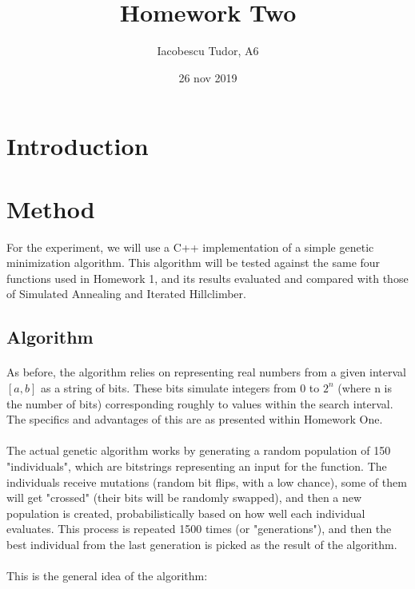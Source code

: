 \documentclass{article}
\title{Homework Two}
\date{26 nov 2019}
\author{Iacobescu Tudor, A6}
\begin{document}
	\maketitle
	
	\section{Introduction}

	\section{Method}
    For the experiment, we will use a C++ implementation of a simple genetic minimization algorithm. This algorithm will be tested against the same four functions used in Homework 1, and its results evaluated and compared with those of Simulated Annealing and Iterated Hillclimber.

    \subsection{Algorithm}
    \paragraph{}
    As before, the algorithm relies on representing real numbers from a given interval \([a, b]\) as a string of bits. These bits simulate integers from 0 to \(2^n\) (where n is the number of bits) corresponding roughly to values within the search interval. The specifics and advantages of this are as presented within Homework One.
    \paragraph{}
    The actual genetic algorithm works by generating a random population of 150 "individuals", which are bitstrings representing an input for the function. The individuals receive mutations (random bit flips, with a low chance), some of them will get "crossed" (their bits will be randomly swapped), and then a new population is created, probabilistically based on how well each individual evaluates. This process is repeated 1500 times (or "generations"), and then the best individual from the last generation is picked as the result of the algorithm.
    \paragraph{}
    This is the general idea of the algorithm:
\end{document}
